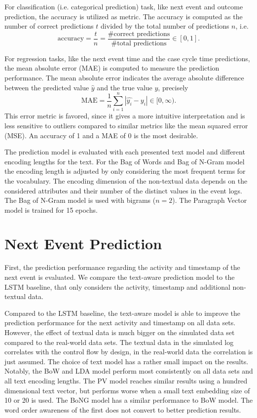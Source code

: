 For classification (i.e. categorical prediction) task, like next event and outcome prediction, the accuracy is utilized as metric.
The accuracy is computed as the number of correct predictions $t$ divided by the total number of predictions $n$, i.e. 
\begin{equation*}
	\textrm{accuracy} = \dfrac{t}{n} = \dfrac{\textrm{\# correct predictions}}{\textrm{\# total predictions}} \in [0,1].
\end{equation*}

For regression tasks, like the next event time and the case cycle time predictions, the mean absolute error (MAE) is computed to measure the prediction performance. The mean absolute error indicates the average absolute difference between the predicted value $\hat{y}$ and the true value $y$,  precisely
\begin{equation*}
	\textrm{MAE} = \dfrac{1}{n}\sum_{i=1}^{n}|\hat{y_i} - y_i| \in [0, \infty).
\end{equation*}
This error metric is favored, since it gives a more intuitive interpretation and is less sensitive to outliers compared to similar metrics like the mean squared error (MSE).
An accuracy of 1 and a MAE of 0 is the most desirable.

The prediction model is evaluated with each presented text model and different encoding lengths for the text.
For the Bag of Words and Bag of N-Gram model the encoding length is adjusted by only considering the most frequent terms for the vocabulary.
The encoding dimension of the non-textual data depends on the considered attributes and their number of the distinct values in the event logs.
The Bag of N-Gram model is used with bigrams ($n=2$).
The Paragraph Vector model is trained for 15 epochs.

\section{Next Event Prediction}

First, the prediction performance regarding the activity and timestamp of the next event is evaluated.
We compare the text-aware prediction model to the LSTM baseline, that only considers the activity, timestamp and additional non-textual data.

Compared to the LSTM baseline, the text-aware model is able to improve the prediction performance for the next activity and timestamp on all data sets.
However, the effect of textual data is much bigger on the simulated data set compared to the real-world data sets.
The textual data in the simulated log correlates with the control flow by design, in the real-world data the correlation is just assumed.
The choice of text model has a rather small impact on the results.
Notably, the BoW and LDA model perform most consistently on all data sets and all text encoding lengths.
The PV model reaches similar results using a hundred dimensional text vector, but performs worse when a small text embedding size of 10 or 20 is used.
The BoNG model has a similar performance to BoW model.
The word order awareness of the first does not convert to better prediction results.





